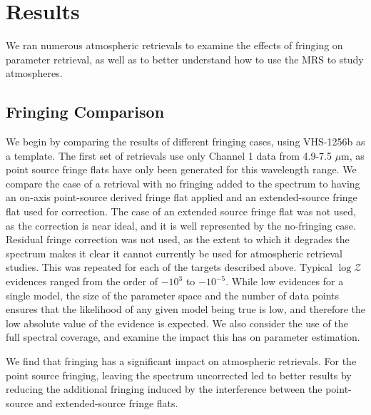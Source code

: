 \section{Results}
We ran numerous atmospheric retrievals to examine the effects of fringing on parameter retrieval, as well as to better understand how to use the MRS to study atmospheres.

\subsection{Fringing Comparison}
We begin by comparing the results of different fringing cases, using VHS-1256b as a template.
The first set of retrievals use only Channel 1 data from 4.9-7.5 $\mu$m, as point source fringe flats have only been generated for this wavelength range.
We compare the case of a retrieval with no fringing added to the spectrum to having an on-axis point-source derived fringe flat applied and an extended-source fringe flat used for correction.
The case of an extended source fringe flat was not used, as the correction is near ideal, and it is well represented by the no-fringing case.
Residual fringe correction was not used, as the extent to which it degrades the spectrum makes it clear it cannot currently be used for atmospheric retrieval studies.
This was repeated for each of the targets described above.
Typical $\log\mathcal{Z}$ evidences ranged from the order of $-10^{3}$ to $-10^{-5}$.
While low evidences for a single model, the size of the parameter space and the number of data points ensures that the likelihood of any given model being true is low, and therefore the low absolute value of the evidence is expected. 
We also consider the use of the full spectral coverage, and examine the impact this has on parameter estimation.

We find that fringing has a significant impact on atmospheric retrievals.
For the point source fringing, leaving the spectrum uncorrected led to better results by reducing the additional fringing induced by the interference between the point-source and extended-source fringe flats.


